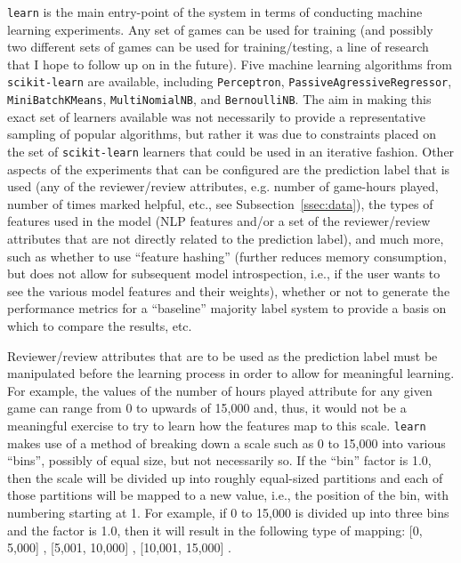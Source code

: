 \documentclass[9pt]{article}
\begin{document}
{\tt learn} is the main entry-point of the system in terms of conducting machine learning experiments. Any set of games can be used for training (and possibly two different sets of games can be used for training/testing, a line of research that I hope to follow up on in the future). Five machine learning algorithms from {\tt scikit-learn} are available, including {\tt Perceptron}, { \tt PassiveAgressiveRegressor}, {\tt MiniBatchKMeans}, {\tt MultiNomialNB}, and {\tt BernoulliNB}. The aim in making this exact set of learners available was not necessarily to provide a representative sampling of popular algorithms, but rather it was due to constraints placed on the set of {\tt scikit-learn} learners that could be used in an iterative fashion. Other aspects of the experiments that can be configured are the prediction label that is used (any of the reviewer/review attributes, e.g. number of game-hours played, number of times marked helpful, etc., see Subsection~\ref{ssec:data}), the types of features used in the model (NLP features and/or a set of the reviewer/review attributes that are not directly related to the prediction label), and much more, such as whether to use ``feature hashing'' (further reduces memory consumption, but does not allow for subsequent model introspection, i.e., if the user wants to see the various model features and their weights), whether or not to generate the performance metrics for a ``baseline'' majority label system to provide a basis on which to compare the results, etc.

Reviewer/review attributes that are to be used as the prediction label must be manipulated before the learning process in order to allow for meaningful learning. For example, the values of the number of hours played attribute for any given game can range from 0 to upwards of 15,000 and, thus, it would not be a meaningful exercise to try to learn how the features map to this scale. {\tt learn} makes use of a method of breaking down a scale such as 0 to 15,000 into various ``bins'', possibly of equal size, but not necessarily so. If the ``bin'' factor is 1.0, then the scale will be divided up into roughly equal-sized partitions and each of those partitions will be mapped to a new value, i.e., the position of the bin, with numbering starting at 1. For example, if 0 to 15,000 is divided up into three bins and the factor is 1.0, then it will result in the following type of mapping: [0, 5,000] , [5,001, 10,000] , [10,001, 15,000] .
\end{document}

